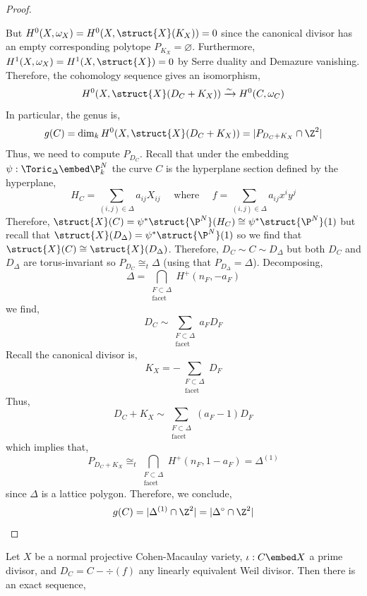 \begin{proof}
\begin{center}
\begin{tikzcd}
\end{tikzcd}
\end{center} 
But $H^0(X, \omega_X) = H^0(X, \struct{X}(K_X)) = 0$ since the canonical divisor    has an empty corresponding polytope $P_{K_X} = \varnothing$. Furthermore, $H^1(X, \omega_X) = H^1(X, \struct{X}) = 0$ by Serre duality and Demazure vanishing. Therefore, the cohomology sequence gives an isomorphism,
\[ H^0(X, \struct{X}(D_C + K_X)) \xrightarrow{\sim} H^0(C, \omega_C) \]
In particular, the genus is,
\[ g(C) = \dim_k H^0(X, \struct{X}(D_C + K_X)) = | P_{D_C + K_X} \cap \Z^2 | \]
Thus, we need to compute $P_{D_C}$. Recall that under the embedding $\psi : \Toric_\Delta \embed \P^N_k$ the curve $C$ is the hyperplane section defined by the hyperplane,
\[ H_C = \sum_{(i, j) \in \Delta} a_{ij} X_{ij} \quad \text{ where } \quad f = \sum_{(i,j) \in \Delta} a_{ij} x^i y^j \]
Therefore, $\struct{X}(C) = \psi^* \struct{\P^N}(H_C) \cong \psi^* \struct{\P^N}(1)$ but recall that $\struct{X}(D_\Delta) = \psi^* \struct{\P^N}(1)$ so we find that $\struct{X}(C) \cong \struct{X}(D_\Delta)$. Therefore, $D_C \sim C \sim D_\Delta$ but both $D_C$ and $D_\Delta$ are torus-invariant so $P_{D_C} \cong_t \Delta$ (using that $P_{D_\Delta} = \Delta$). Decomposing,
\[ \Delta = \bigcap_{\substack{F \subset \Delta \\ \text{facet}}} H^+(n_F, - a_F) \]
we find,
\[ D_C \sim \sum_{\substack{F \subset \Delta \\ \text{facet}}} a_F D_F \]
Recall the canonical divisor is,
\[ K_X = - \sum_{\substack{F \subset \Delta \\ \text{facet}}} D_F \]
Thus,
\[ D_C + K_X \sim \sum_{\substack{F \subset \Delta \\ \text{facet}}} (a_F - 1) D_F \]
which implies that,
\[ P_{D_C + K_X} \cong_t \bigcap_{\substack{F \subset \Delta \\ \text{facet}}} H^+(n_F, 1 - a_F) = \Delta^{(1)} \]
since $\Delta$ is a lattice polygon. Therefore, we conclude,
\[ g(C) = | \Delta^{(1)} \cap \Z^2 | = | \Delta^\circ \cap \Z^2 | \]
\end{proof}

\begin{theorem} \label{adjunction}
Let $X$ be a normal projective Cohen-Macaulay variety, $\iota : C \embed X$ a prime divisor, and $D_C = C - \div{(f)}$ any linearly equivalent Weil divisor. Then there is an exact sequence,
\begin{center}
\end{center}
\end{theorem}

